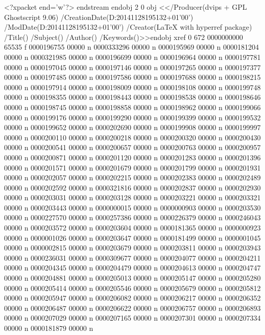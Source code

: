 {{{{{{{                                                                        
<?xpacket end='w'?>
endstream
endobj
2 0 obj
<</Producer(dvips + GPL Ghostscript 9.06)
/CreationDate(D:20141128195132+01'00')
/ModDate(D:20141128195132+01'00')
/Creator(LaTeX with hyperref package)
/Title()
/Subject()
/Author()
/Keywords()>>endobj
xref
0 672
0000000000 65535 f 
0000196755 00000 n 
0000333296 00000 n 
0000195969 00000 n 
0000181204 00000 n 
0000321985 00000 n 
0000196699 00000 n 
0000196964 00000 n 
0000197781 00000 n 
0000197045 00000 n 
0000197146 00000 n 
0000197265 00000 n 
0000197377 00000 n 
0000197485 00000 n 
0000197586 00000 n 
0000197688 00000 n 
0000198215 00000 n 
0000197914 00000 n 
0000198009 00000 n 
0000198108 00000 n 
0000199748 00000 n 
0000198355 00000 n 
0000198443 00000 n 
0000198538 00000 n 
0000198646 00000 n 
0000198745 00000 n 
0000198858 00000 n 
0000198962 00000 n 
0000199066 00000 n 
0000199176 00000 n 
0000199290 00000 n 
0000199399 00000 n 
0000199532 00000 n 
0000199652 00000 n 
0000202690 00000 n 
0000199908 00000 n 
0000199997 00000 n 
0000200110 00000 n 
0000200218 00000 n 
0000200320 00000 n 
0000200430 00000 n 
0000200541 00000 n 
0000200657 00000 n 
0000200763 00000 n 
0000200957 00000 n 
0000200871 00000 n 
0000201120 00000 n 
0000201283 00000 n 
0000201396 00000 n 
0000201571 00000 n 
0000201679 00000 n 
0000201799 00000 n 
0000201931 00000 n 
0000202057 00000 n 
0000202215 00000 n 
0000202383 00000 n 
0000202489 00000 n 
0000202592 00000 n 
0000321816 00000 n 
0000202837 00000 n 
0000202930 00000 n 
0000203031 00000 n 
0000203128 00000 n 
0000203221 00000 n 
0000203321 00000 n 
0000203443 00000 n 
0000000015 00000 n 
0000000903 00000 n 
0000203530 00000 n 
0000227570 00000 n 
0000257386 00000 n 
0000226379 00000 n 
0000246043 00000 n 
0000203572 00000 n 
0000203604 00000 n 
0000181365 00000 n 
0000000923 00000 n 
0000001026 00000 n 
0000203647 00000 n 
0000181499 00000 n 
0000001045 00000 n 
0000002815 00000 n 
0000203679 00000 n 
0000203811 00000 n 
0000203943 00000 n 
0000236031 00000 n 
0000309677 00000 n 
0000204077 00000 n 
0000204211 00000 n 
0000204345 00000 n 
0000204479 00000 n 
0000204613 00000 n 
0000204747 00000 n 
0000204881 00000 n 
0000205013 00000 n 
0000205147 00000 n 
0000205280 00000 n 
0000205414 00000 n 
0000205546 00000 n 
0000205679 00000 n 
0000205812 00000 n 
0000205947 00000 n 
0000206082 00000 n 
0000206217 00000 n 
0000206352 00000 n 
0000206487 00000 n 
0000206622 00000 n 
0000206757 00000 n 
0000206893 00000 n 
0000207029 00000 n 
0000207165 00000 n 
0000207301 00000 n 
0000207334 00000 n 
0000181879 00000 n 
}}}}}}}
